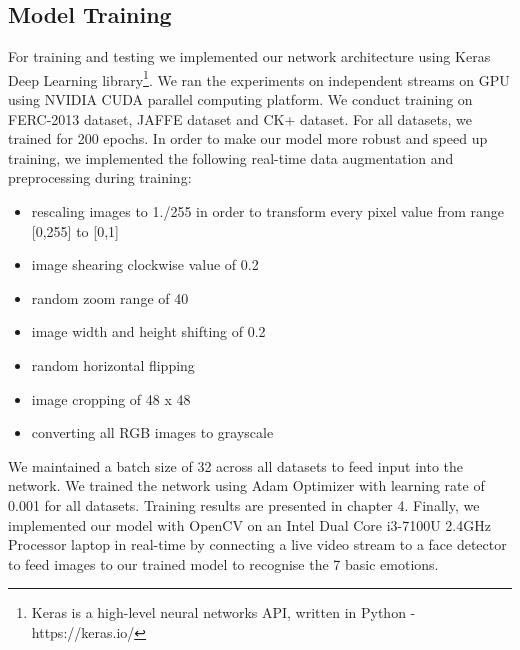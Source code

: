 \documentclass[master]{thesis-uestc}
\begin{document}
\subsection{Model Training}
For training and testing we implemented our network architecture using Keras Deep Learning library\footnote{Keras is a high-level neural networks API, written in Python - https://keras.io/}. We ran the experiments on independent streams on GPU using NVIDIA CUDA parallel computing platform. We conduct training on FERC-2013 dataset, JAFFE dataset and CK+ dataset. For all datasets, we trained for 200 epochs. In order to make our model more robust and speed up training, we implemented the following real-time data augmentation and preprocessing during training:
\begin{itemize}
 \item rescaling images to 1./255 in order to transform every pixel value from range [0,255] to [0,1]
 \item image shearing clockwise value of 0.2
 \item  random zoom range of 40
 \item  image width and height shifting of 0.2
 \item random horizontal flipping
 \item image cropping of 48 x 48
 \item converting all RGB images to grayscale
\end{itemize}
We maintained a batch size of 32 across all datasets to feed input into the network. We trained the network using Adam Optimizer  with learning rate of 0.001 for all datasets. Training results are presented in chapter 4. Finally, we implemented our model with OpenCV on an Intel Dual Core i3-7100U 2.4GHz Processor laptop in real-time by connecting a live video stream to a face detector to feed images to our trained model to recognise the 7 basic emotions.
\end{document}
